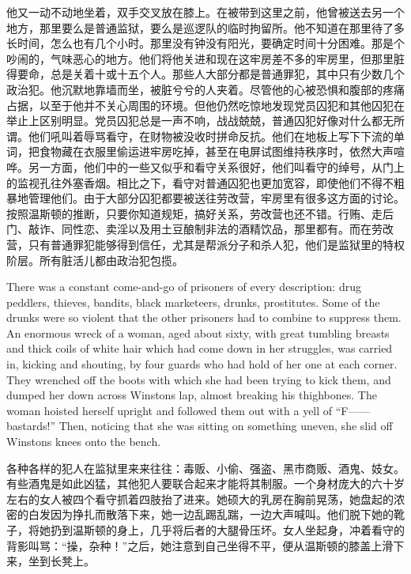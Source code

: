 \begin{paracol}{2}
他又一动不动地坐着，双手交叉放在膝上。在被带到这里之前，他曾被送去另一个地方，那里要么是普通监狱，要么是巡逻队的临时拘留所。他不知道在那里待了多长时间，怎么也有几个小时。那里没有钟没有阳光，要确定时间十分困难。那是个吵闹的，气味恶心的地方。他们将他关进和现在这牢房差不多的牢房里，但那里脏得要命，总是关着十或十五个人。那些人大部分都是普通罪犯，其中只有少数几个政治犯。他沉默地靠墙而坐，被脏兮兮的人夹着。尽管他的心被恐惧和腹部的疼痛占据，以至于他并不关心周围的环境。但他仍然吃惊地发现党员囚犯和其他囚犯在举止上区别明显。党员囚犯总是一声不响，战战兢兢，普通囚犯好像对什么都无所谓。他们吼叫着辱骂看守，在财物被没收时拼命反抗。他们在地板上写下下流的单词，把食物藏在衣服里偷运进牢房吃掉，甚至在电屏试图维持秩序时，依然大声喧哗。另一方面，他们中的一些又似乎和看守关系很好，他们叫看守的绰号，从门上的监视孔往外塞香烟。相比之下，看守对普通囚犯也更加宽容，即使他们不得不粗暴地管理他们。由于大部分囚犯都要被送往劳改营，牢房里有很多这方面的讨论。按照温斯顿的推断，只要你知道规矩，搞好关系，劳改营也还不错。行贿、走后门、敲诈、同性恋、卖淫以及用土豆酿制非法的酒精饮品，那里都有。而在劳改营，只有普通罪犯能够得到信任，尤其是帮派分子和杀人犯，他们是监狱里的特权阶层。所有脏活儿都由政治犯包揽。

\switchcolumn*

There was a constant come-and-go of prisoners of every description: drug
peddlers, thieves, bandits, black marketeers, drunks, prostitutes. Some
of the drunks were so violent that the other prisoners had to combine to
suppress them. An enormous wreck of a woman, aged about sixty, with
great tumbling breasts and thick coils of white hair which had come down
in her struggles, was carried in, kicking and shouting, by four guards
who had hold of her one at each corner. They wrenched off the boots with
which she had been trying to kick them, and dumped her down across
Winston\textquotesingle s lap, almost breaking his thighbones. The woman
hoisted herself upright and followed them out with a yell of ``F------
bastards!'' Then, noticing that she was sitting on something uneven, she
slid off Winston\textquotesingle s knees onto the bench.

\switchcolumn

各种各样的犯人在监狱里来来往往：毒贩、小偷、强盗、黑市商贩、酒鬼、妓女。有些酒鬼是如此凶猛，其他犯人要联合起来才能将其制服。一个身材庞大的六十岁左右的女人被四个看守抓着四肢抬了进来。她硕大的乳房在胸前晃荡，她盘起的浓密的白发因为挣扎而散落下来，她一边乱踢乱踹，一边大声喊叫。他们脱下她的靴子，将她扔到温斯顿的身上，几乎将后者的大腿骨压坏。女人坐起身，冲着看守的背影叫骂：``操，杂种！''之后，她注意到自己坐得不平，便从温斯顿的膝盖上滑下来，坐到长凳上。


\end{paracol}
